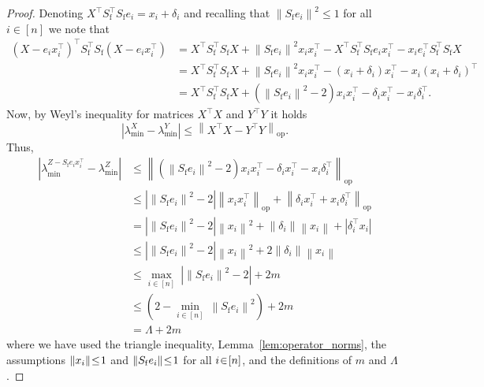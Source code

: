 \documentclass[11pt]{article}
\theoremstyle{definition}
\theoremstyle{plain}
\providecommand{\lemmaref}[1]{Lemma~\ref{#1}}
\newcommand{\abs}[1]{\left| #1 \right|}
\newcommand{\Norm}[1]{\left\| #1 \right\|}
\providecommand{\norm}[1]{\Norm{#1}}
\begin{document}
\begin{proof}
Denoting $X^{\top}S_{\mathrm{f}}^{\top}S_{\mathrm{f}}e_i = x_i + \delta_i$ and recalling that $\norm{S_{\mathrm{f}}e_i}^2 \leq 1$ for all $i\in [n]$ we note that 
\begin{align}
    \left(X - e_ix^{\top}_i\right)^{\top}S_{\mathrm{f}}^{\top}S_{\mathrm{f}}\left(X - e_ix^{\top}_i\right) &= X^{\top}S_{\mathrm{f}}^{\top}S_{\mathrm{f}}X + \norm{S_{\mathrm{f}}e_i}^2x_ix^{\top}_i - X^{\top}S_{\mathrm{f}}^{\top}S_{\mathrm{f}}e_ix^{\top}_i - x_i e^{\top}_iS_{\mathrm{f}}^{\top}S_{\mathrm{f}}X\\
    &= X^{\top}S_{\mathrm{f}}^{\top}S_{\mathrm{f}}X + \norm{S_{\mathrm{f}}e_i}^2x_ix^{\top}_i - (x_i + \delta_i)x^{\top}_i - x_i (x_i + \delta_i)^{\top}\\
    &= X^{\top}S_{\mathrm{f}}^{\top}S_{\mathrm{f}}X + \left(\norm{S_{\mathrm{f}}e_i}^2 - 2\right)x_ix^{\top}_i - \delta_i x^{\top}_i - x_i\delta^{\top}_i. 
\end{align}
Now, by Weyl's inequality \citep[Theorem.~1]{stewart1998perturbation} for matrices $X^{\top}X$ and $Y^{\top}Y$ it holds
\begin{equation}
    \abs{\lambda^{X}_{\min} - \lambda^{Y}_{\min}} \leq \norm{X^{\top}X - Y^{\top}Y}_{\mathrm{op}}. 
\end{equation}
Thus, 
\begin{align}
    \abs{\lambda^{Z - S_{\mathrm{f}}e_ix^{\top}_i}_{\min} - \lambda^{Z}_{\min}} &\leq \norm{\left(\norm{S_{\mathrm{f}}e_i}^2 - 2\right)x_ix^{\top}_i - \delta_i x^{\top}_i - x_i\delta^{\top}_i}_{\mathrm{op}}\\
    &\leq \abs{\norm{S_{\mathrm{f}}e_i}^2 - 2}\norm{x_ix^{\top}_i}_{\mathrm{op}} + \norm{\delta_i x^{\top}_i + x_i \delta^{\top}_i}_{\mathrm{op}}\\
    &= \abs{\norm{S_{\mathrm{f}}e_i}^2 - 2}\norm{x_i}^2 + \norm{\delta_i}\norm{x_i} + \abs{\delta^{\top}_i x_i}\\  
    &\leq \abs{\norm{S_{\mathrm{f}}e_i}^2 - 2}\norm{x_i}^2 + 2\norm{\delta_i}\norm{x_i}\\
    &\leq \underset{i\in[n]}{\max} \ \abs{\norm{S_{\mathrm{f}}e_i}^2 - 2} + 2m\\
    &\leq \left(2 - \underset{i\in[n]}{\min} \ \norm{S_{\mathrm{f}}e_i}^2\right) + 2m\\
    &= \Lambda + 2m
\end{align}
where we have used the triangle inequality, \lemmaref{lem:operator_norms}, the assumptions $\norm{x_i} \hspace{-0.2em}\leq\hspace{-0.2em} 1$ and $\norm{S_{\mathrm{f}}e_i} \hspace{-0.2em}\leq\hspace{-0.2em} 1$ for all $i\hspace{-0.2em}\in\hspace{-0.2em} [n]$, and the definitions of $m$ and $\Lambda$. 

\end{proof}
\end{document}
